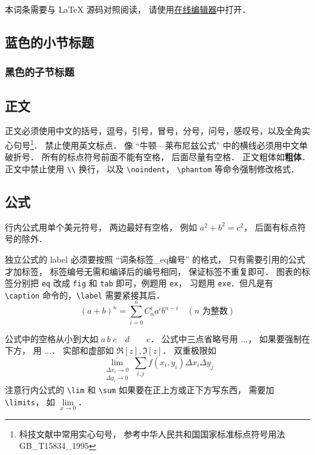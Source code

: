 

本词条需要与 LaTeX 源码对照阅读， 请使用\href{http://wuli.wiki/editor}{在线编辑器}中打开．
\subsection{蓝色的小节标题}
\subsubsection{黑色的子节标题}

\subsection{正文}
正文必须使用中文的括号，逗号，引号，冒号，分号，问号，感叹号，以及全角实心句号\footnote{科技文献中常用实心句号， 参考中华人民共和国国家标准标点符号用法 GB\_T15834\_1995}． 禁止使用英文标点． 像 “牛顿—莱布尼兹公式” 中的横线必须用中文单破折号． 所有的标点符号前面不能有空格， 后面尽量有空格． 正文粗体如\textbf{粗体}． 正文中禁止使用 \verb|\\| 换行， 以及 \verb|\noindent|， \verb|\phantom| 等命令强制修改格式．

\subsection{公式}
行内公式用单个美元符号， 两边最好有空格， 例如 $a^2+b^2=c^2$， 后面有标点符号的除外．

独立公式的 label 必须要按照 “词条标签\_eq编号” 的格式， 只有需要引用的公式才加标签， 标签编号无需和编译后的编号相同， 保证标签不重复即可． 图表的标签分别把 \verb|eq| 改成 \verb|fig| 和 \verb|tab| 即可，例题用 \verb|ex|， 习题用 \verb|exe|．但凡是有 \verb|\caption| 命令的，\verb|\label| 需要紧接其后．
\begin{equation}\label{Sample_eq1}
(a+b)^n = \sum_{i=0}^n C_n^i a^i b^{n-i} \quad (\text{$n$ 为整数})
\end{equation}

公式中的空格从小到大如 $a\, b\; c\quad d\qquad e$． 公式中三点省略号用 $\dots$， 如果要强制在下方， 用 $\ldots$． 实部和虚部如 $\Re[z], \Im[z]$． 双重极限如
\begin{equation}
\lim_{\substack{\Delta x_i\to 0\\ \Delta y_i\to 0}} \sum_{i, j} f(x_i,y_i) \Delta x_i \Delta y_j
\end{equation}
注意行内公式的 \verb|\lim| 和 \verb|\sum| 如果要在正上方或正下方写东西， 需要加 \verb|\limits|， 如 $\lim\limits_{x\to 0}$．

